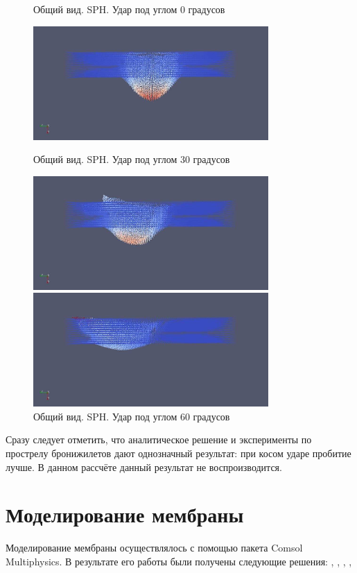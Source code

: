 \begin{figure}[H]
    \centering

    \caption{Общий вид. SPH. Удар под углом 0 градусов}
    \includegraphics[width=0.8\textwidth]{img/sph_0.png}

    \caption{Общий вид. SPH. Удар под углом 30 градусов}
    \includegraphics[width=0.8\textwidth]{img/sph_30.png}

    \caption{Общий вид. SPH. Удар под углом 60 градусов}
    \includegraphics[width=0.8\textwidth]{img/sph_60.png}
\end{figure}

Сразу следует отметить, что аналитическое решение и эксперименты по прострелу бронижилетов дают однозначный результат:
при косом ударе пробитие лучше.
В данном рассчёте данный результат не воспроизводится.

\section{Моделирование мембраны}\label{sec:model-membrane}
Моделирование мембраны осуществлялось с помощью пакета Comsol Multiphysics.
В результате его работы были получены следующие решения: , ,
, , 

